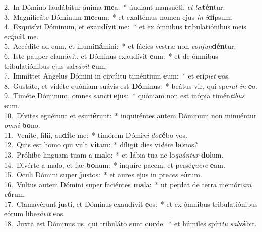 {2.~}In Dómino laudábitur ánima \textbf{me}a:~* áudiant mansuéti, \textit{et} \textit{læ}\textbf{tén}tur.\\
{3.~}Magnificáte Dóminum \textbf{me}cum:~* et exaltémus nomen ejus \textit{in} \textit{i}\textbf{dí}psum.\\
{4.~}Exquisívi Dóminum, et exau\textbf{dí}vit me:~* et ex ómnibus tribulatiónibus meis e\textit{rí}\textit{pu}\textbf{it} me.\\
{5.~}Accédite ad eum, et illumi\textbf{ná}mini:~* et fácies vestræ non \textit{con}\textit{fun}\textbf{dén}tur.\\
{6.~}Iste pauper clamávit, et Dóminus exaudívit \textbf{e}um:~* et de ómnibus tribulatiónibus ejus sal\textit{vá}\textit{vit} \textbf{e}um.\\
{7.~}Immíttet Angelus Dómini in circúitu timéntium \textbf{e}um:~* et erí\textit{pi}\textit{et} \textbf{e}os.\\
{8.~}Gustáte, et vidéte quóniam suávis est \textbf{Dó}minus:~* beátus vir, qui spe\textit{rat} \textit{in} \textbf{e}o.\\
{9.~}Timéte Dóminum, omnes sancti \textbf{e}jus:~* quóniam non est inópia timén\textit{ti}\textit{bus} \textbf{e}um.\\
{10.~}Dívites eguérunt et esuri\textbf{é}runt:~* inquiréntes autem Dóminum non minuéntur \textit{om}\textit{ni} \textbf{bo}no.\\
{11.~}Veníte, fílii, au\textbf{dí}te me:~* timórem Dómi\textit{ni} \textit{do}\textbf{cé}bo vos.\\
{12.~}Quis est homo qui vult \textbf{vi}tam:~* díligit dies vi\textit{dé}\textit{re} \textbf{bo}nos?\\
{13.~}Próhibe linguam tuam a \textbf{ma}lo:~* et lábia tua ne lo\textit{quán}\textit{tur} \textbf{do}lum.\\
{14.~}Divérte a malo, et fac \textbf{bo}num:~* inquíre pacem, et persé\textit{que}\textit{re} \textbf{e}am.\\
{15.~}Oculi Dómini super \textbf{ju}stos:~* et aures ejus in pre\textit{ces} \textit{e}\textbf{ó}rum.\\
{16.~}Vultus autem Dómini super faciéntes \textbf{ma}la:~* ut perdat de terra memóri\textit{am} \textit{e}\textbf{ó}rum.\\
{17.~}Clamavérunt justi, et Dóminus exaudívit \textbf{e}os:~* et ex ómnibus tribulatiónibus eórum libe\textit{rá}\textit{vit} \textbf{e}os.\\
{18.~}Juxta est Dóminus iis, qui tribuláto sunt \textbf{cor}de:~* et húmiles spíri\textit{tu} \textit{sal}\textbf{vá}bit.\\
